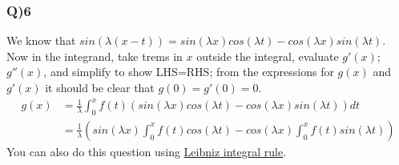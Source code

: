 \documentclass[11pt]{beamer}
\begin{document}
\begin{frame}
\frametitle{Q)6}
We know that $sin (\lambda (x-t))=sin(\lambda x)cos(\lambda t)-cos(\lambda x) sin(\lambda t)$. Now in the integrand, take trems in $x$
outside the integral, evaluate $g'(x)$; $g''(x)$, and simplify to show LHS=RHS; from the
expressions for $g(x)$ and $g'(x)$ it should be clear that $g(0)=g'(0)=0$.
\begin{align*}
g(x)&=\frac{1}{\lambda}\int_0^xf(t)(sin(\lambda x)cos(\lambda t)-cos(\lambda x) sin(\lambda t))dt\\
&=\frac{1}{\lambda}\left(sin(\lambda x)\int_0^xf(t)cos(\lambda t)-cos(\lambda x)\int_0^xf(t)sin(\lambda t) \right)
\end{align*}
You can also do this question using \href{https://en.wikipedia.org/wiki/Leibniz_integral_rule}{Leibniz integral rule}.
\end{frame}
\end{document}
